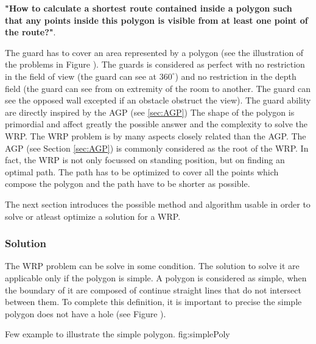 \textbf{"How to calculate a shortest route contained inside a polygon such that any points inside this polygon is visible from at least one point of the route?"}.  

The guard has to cover an area represented by a polygon (see the illustration of the problems in Figure ). The guards is considered as perfect with no restriction in the field of view (the guard can see at $360^\circ$) and no restriction in the depth field (the guard can see from on extremity of the room to another. The guard can see the opposed wall excepted if an obstacle obstruct the view). The guard ability are directly inspired by the AGP (see \ref{sec:AGP})
The shape of the polygon is primordial and affect greatly the possible answer and the complexity to solve the WRP.
The WRP problem is by many aspects closely related than the AGP. The AGP (see Section \ref{sec:AGP}) is commonly considered as the root of the WRP.
 In fact, the WRP is not only focussed on standing position, but on finding an optimal path. The path has to be optimized to cover all the points which compose the polygon  and the path have to be shorter as possible.
 
 The next section introduces the possible method and algorithm usable in order to solve or atleast optimize a solution for a WRP.
 



 
\subsubsection{Solution} 

The WRP problem can be solve in some condition. The solution to solve it are applicable only if the polygon is simple. A polygon is considered as simple, when the boundary of it are composed of continue straight lines that do not intersect between them. To complete this definition, it is important to precise the simple polygon does not have a hole (see Figure ). 
 \begin{mfigures}[!]
{Few example to illustrate the simple polygon. }{fig:simplePoly} \centering
{}
\hspace{1cm}
\hspace{1cm}
\end{mfigures}	

